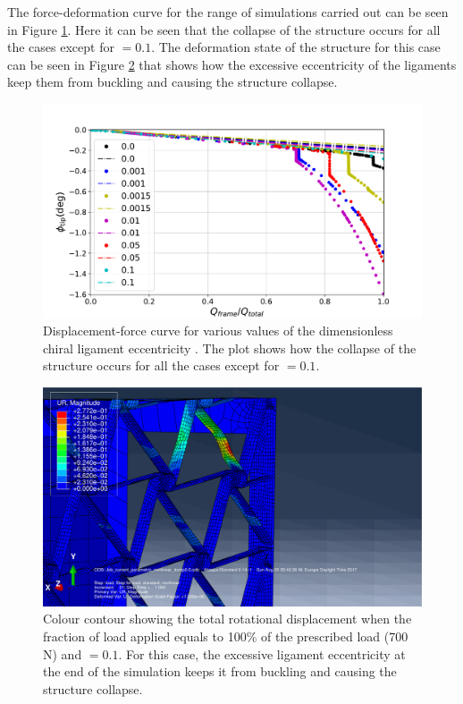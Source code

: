      The force-deformation curve for the range of simulations carried out can be seen in Figure \ref{fig:forceDisplacement-far-e}. Here it can be seen that the collapse of the structure occurs for all the cases except for \chie$= 0.1$. The deformation state of the structure for this case can be seen in Figure \ref{fig:e0coma1-UR} that shows how the excessive eccentricity of the ligaments keep them from buckling and causing the structure collapse.

      \begin{figure}[!htpb] %
        \centering
        \includegraphics[width=0.8 \textwidth]{figures/result-sim/eccen/force_displacement-far}
        \caption[Displacement-force curve for various values of the dimensionless chiral ligament eccentricity]{Displacement-force curve for various values of the dimensionless chiral ligament eccentricity \chie. The plot shows how the collapse of the structure occurs for all the cases except for \chie$= 0.1$.}\label{fig:forceDisplacement-far-e}
      \end{figure}

      \begin{figure}[!htpb] %
        \centering
        \includegraphics[width=0.6 \textwidth]{figures/result-sim/eccen/0coma1-700N}
        \caption[Colour contour showing the total rotational displacement when the fraction of load applied equals to 100\% of the prescribed load (700 N) and \chie$= 0.1$]{Colour contour showing the total rotational displacement when the fraction of load applied equals to 100\% of the prescribed load (700 N) and \chie$= 0.1$. For this case, the excessive ligament eccentricity at the end of the simulation keeps it from buckling and causing the structure collapse.}
        \label{fig:e0coma1-UR}
      \end{figure}

